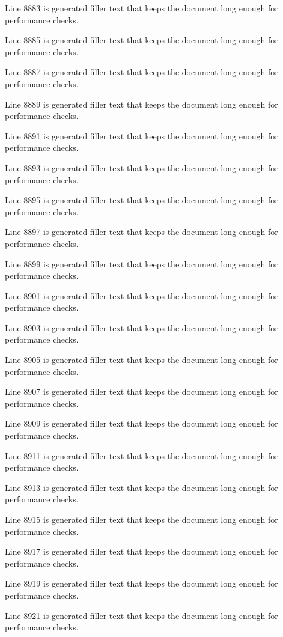 Line 8883 is generated filler text that keeps the document long enough for performance checks.

Line 8885 is generated filler text that keeps the document long enough for performance checks.

Line 8887 is generated filler text that keeps the document long enough for performance checks.

Line 8889 is generated filler text that keeps the document long enough for performance checks.

Line 8891 is generated filler text that keeps the document long enough for performance checks.

Line 8893 is generated filler text that keeps the document long enough for performance checks.

Line 8895 is generated filler text that keeps the document long enough for performance checks.

Line 8897 is generated filler text that keeps the document long enough for performance checks.

Line 8899 is generated filler text that keeps the document long enough for performance checks.

Line 8901 is generated filler text that keeps the document long enough for performance checks.

Line 8903 is generated filler text that keeps the document long enough for performance checks.

Line 8905 is generated filler text that keeps the document long enough for performance checks.

Line 8907 is generated filler text that keeps the document long enough for performance checks.

Line 8909 is generated filler text that keeps the document long enough for performance checks.

Line 8911 is generated filler text that keeps the document long enough for performance checks.

Line 8913 is generated filler text that keeps the document long enough for performance checks.

Line 8915 is generated filler text that keeps the document long enough for performance checks.

Line 8917 is generated filler text that keeps the document long enough for performance checks.

Line 8919 is generated filler text that keeps the document long enough for performance checks.

Line 8921 is generated filler text that keeps the document long enough for performance checks.

